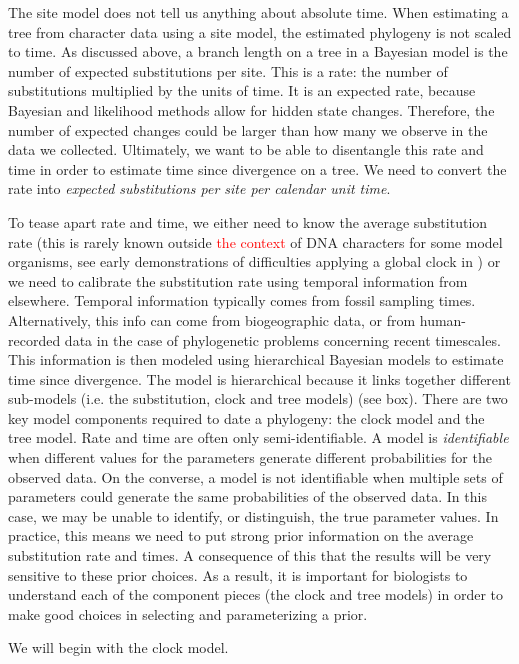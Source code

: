 \documentclass[11pt]{article}
\newcommand{\edit}[1]{{\textcolor{red}{#1}}} %
\begin{document}
The site model does not tell us anything about absolute time.
When estimating a tree from character data using a site model, the estimated phylogeny is not scaled to time.
As discussed above, a branch length on a tree in a Bayesian model is the number of expected substitutions per site.
This is a rate: the number of substitutions multiplied by the units of time.
It is an expected rate, because Bayesian and likelihood methods allow for hidden state changes.
Therefore, the number of expected changes could be larger than how many we observe in the data we collected.
Ultimately, we want to be able to disentangle this rate and time in order to estimate time since divergence on a tree.
We need to convert the rate into \textit{expected substitutions per site per calendar unit time}.


To tease apart rate and time, we either need to know the average substitution rate (this is rarely known outside \edit{the context} of DNA characters for some model organisms, see early demonstrations of difficulties applying a global clock in \cite{gaut1992, MOOERS1994, bromham1996, rambaut1998}) or we need to calibrate the substitution rate using temporal information from elsewhere.
Temporal information typically comes from  fossil sampling times.
Alternatively, this info can come from biogeographic data, or from human-recorded data in the case of phylogenetic problems concerning recent timescales.
This information is then modeled using hierarchical  Bayesian models to estimate time since divergence.
The model is hierarchical because it links together different sub-models (i.e. the substitution, clock and tree models) (see box).
There are two key model components required to date a phylogeny: the clock model and the tree model.
Rate and time are often only semi-identifiable.
A model is \textit{identifiable} when different values for the parameters generate different probabilities for the observed data.
On the converse, a model is not identifiable when multiple sets of parameters could generate the same probabilities of the observed data.
In this case, we may be unable to identify, or distinguish, the true parameter values.
In practice, this means we need to put strong prior information on the average substitution rate and times. 
A consequence of this that the results will be very sensitive to these prior choices.
As a result, it is important for biologists to understand each of the component pieces (the clock and tree models) in order to make good choices in selecting and parameterizing a prior.

We will begin with the clock model.
\end{document}
